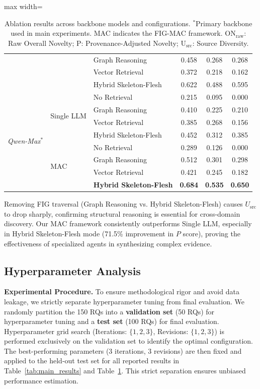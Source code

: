 \documentclass[runningheads]{llncs}
\begin{document}
\begin{table}[t]
\begin{adjustbox}{max width=\textwidth}
\begin{tabular}{lllccc}
 &  & Graph Reasoning & 0.458 & 0.268 & 0.268 \\
 &  & Vector Retrieval & 0.372 & 0.218 & 0.162 \\
 &  & Hybrid Skeleton-Flesh & 0.622 & 0.488 & 0.595 \\
\midrule
\multirow{8}{*}{\textit{Qwen-Max}$^*$} 
 & \multirow{4}{*}{Single LLM} & No Retrieval & 0.215 & 0.095 & 0.000 \\
 &  & Graph Reasoning & 0.410 & 0.225 & 0.210 \\
 &  & Vector Retrieval & 0.385 & 0.268 & 0.156 \\
 &  & Hybrid Skeleton-Flesh & 0.452 & 0.312 & 0.385 \\
\cmidrule{2-6}
 & \multirow{4}{*}{MAC} & No Retrieval & 0.289 & 0.126 & 0.000 \\
 &  & Graph Reasoning & 0.512 & 0.301 & 0.298 \\
 &  & Vector Retrieval & 0.421 & 0.245 & 0.182 \\
 &  & \textbf{Hybrid Skeleton-Flesh} & \textbf{0.684} & \textbf{0.535} & \textbf{0.650} \\
\bottomrule
\end{tabular}
\end{adjustbox}
\caption{Ablation results across backbone models and configurations. $^*$Primary backbone used in main experiments. MAC indicates the FIG-MAC framework. ON$_{\text{raw}}$: Raw Overall Novelty; P: Provenance-Adjusted Novelty; U$_{\text{src}}$: Source Diversity.}
\label{tab:ablation_results}
\end{table}

Removing FIG traversal (Graph Reasoning vs. Hybrid Skeleton-Flesh) causes $U_{\text{src}}$ to drop sharply, confirming structural reasoning is essential for cross-domain discovery. Our MAC framework consistently outperforms Single LLM, especially in Hybrid Skeleton-Flesh mode (71.5\% improvement in $P$ score), proving the effectiveness of specialized agents in synthesizing complex evidence.
\subsection{Hyperparameter Analysis}
\label{sec:hyperparams}

\textbf{Experimental Procedure.} To ensure methodological rigor and avoid data leakage, we strictly separate hyperparameter tuning from final evaluation. We randomly partition the 150 RQs into a \textbf{validation set} (50 RQs) for hyperparameter tuning and a \textbf{test set} (100 RQs) for final evaluation. Hyperparameter grid search (Iterations: $\{1,2,3\}$, Revisions: $\{1,2,3\}$) is performed exclusively on the validation set to identify the optimal configuration. The best-performing parameters (3 iterations, 3 revisions) are then fixed and applied to the held-out test set for all reported results in Table~\ref{tab:main_results} and Table~\ref{tab:ablation_results}. This strict separation ensures unbiased performance estimation.
\end{document}
